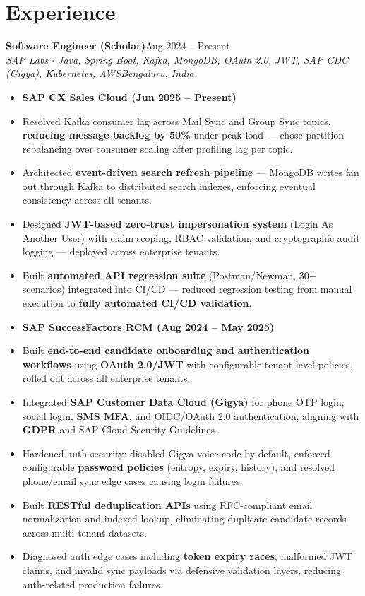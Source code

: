 \documentclass[letterpaper,10.5pt]{article}
\newcommand{\resumeSubheading}[4]{
  \vspace{2pt}
  {\small\textbf{#1}}\hfill{\small #4}\\[-1pt]
  {\footnotesize\textit{#3}}\hfill{\footnotesize\textit{#2}}\\[-5pt]
}
\newcommand{\resumeItem}[1]{\item\small{#1}}
\newcommand{\resumeSubItem}[1]{
  \item[]\vspace{4pt}\small{\textbf{#1}}\vspace{2pt}
}
\newcommand{\resumeItemListStart}{
  \begin{itemize}[leftmargin=1.1em, itemsep=0pt, topsep=2pt, parsep=0pt]
}
\newcommand{\resumeItemListEnd}{\end{itemize}\vspace{-1pt}}
\begin{document}
\vspace{4pt}
\vspace{4pt}
\vspace{4pt}
\section{Experience}

\resumeSubheading
{Software Engineer (Scholar)}{Bengaluru, India}
{SAP Labs $\cdot$ Java, Spring Boot, Kafka, MongoDB, OAuth 2.0, JWT, SAP CDC (Gigya), Kubernetes, AWS}{Aug 2024 -- Present}
\resumeItemListStart
  \resumeSubItem{SAP CX Sales Cloud (Jun 2025 -- Present)}
  \resumeItem{Resolved Kafka consumer lag across Mail Sync and Group Sync topics, \textbf{reducing message backlog by 50\%} under peak load --- chose partition rebalancing over consumer scaling after profiling lag per topic.}
  \resumeItem{Architected \textbf{event-driven search refresh pipeline} --- MongoDB writes fan out through Kafka to distributed search indexes, enforcing eventual consistency across all tenants.}
  \resumeItem{Designed \textbf{JWT-based zero-trust impersonation system} (Login As Another User) with claim scoping, RBAC validation, and cryptographic audit logging --- deployed across enterprise tenants.}
  \resumeItem{Built \textbf{automated API regression suite} (Postman/Newman, 30+ scenarios) integrated into CI/CD --- reduced regression testing from manual execution to \textbf{fully automated CI/CD validation}.}

  \resumeSubItem{SAP SuccessFactors RCM (Aug 2024 -- May 2025)}
  \resumeItem{Built \textbf{end-to-end candidate onboarding and authentication workflows} using \textbf{OAuth 2.0/JWT} with configurable tenant-level policies, rolled out across all enterprise tenants.}
  \resumeItem{Integrated \textbf{SAP Customer Data Cloud (Gigya)} for phone OTP login, social login, \textbf{SMS MFA}, and OIDC/OAuth 2.0 authentication, aligning with \textbf{GDPR} and SAP Cloud Security Guidelines.}
  \resumeItem{Hardened auth security: disabled Gigya voice code by default, enforced configurable \textbf{password policies} (entropy, expiry, history), and resolved phone/email sync edge cases causing login failures.}
  \resumeItem{Built \textbf{RESTful deduplication APIs} using RFC-compliant email normalization and indexed lookup, eliminating duplicate candidate records across multi-tenant datasets.}
  \resumeItem{Diagnosed auth edge cases including \textbf{token expiry races}, malformed JWT claims, and invalid sync payloads via defensive validation layers, reducing auth-related production failures.}
\resumeItemListEnd
\end{document}
